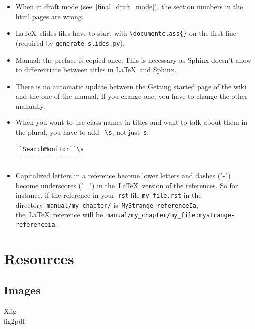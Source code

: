 \documentclass[a4paper,10pt]{article}
\newcommand{\code}[1]{\texttt{#1}}
\begin{document}
\begin{itemize}
 \item When in draft mode (see~\ref{final_draft_mode}), the section numbers in the html pages are wrong. 
 \item \LaTeX\ slides files have to start with \code{\textbackslash documentclass\{\}} on the first line (required by \code{generate\_slides.py}).
 \item Manual: the preface is copied once. This is necessary as Sphinx doesn't allow to differentiate between titles in \LaTeX\ and Sphinx.
 \item There is no automatic update between the Getting started page of the wiki and the one of the manual. If you change one, you have to change the other manually. 
 \item When you want to use class names in titles and want to talk about them in the plural, you have to add ~\verb+\s+, not just~\verb+s+:
  \begin{verbatim}
``SearchMonitor``\s
-------------------
  \end{verbatim}

  \item Capitalized letters in a reference become lower letters and dashes ("-") become underscores ("\_") in the~\LaTeX\ version of the references. So for instance, if the reference in your~\code{rst} file \code{my\_file.rst} in the directory~\code{manual/my\_chapter/} is~\code{MyStrange\_referenceIa}, the~\LaTeX~reference will be~\code{manual/my\_chapter/my\_file:mystrange-referenceia}. 
\end{itemize}

\section{Resources}

\subsection{Images}
\begin{description}
 \item[Xfig]
 \item[fig2pdf]
 \end{description}
\end{document}
